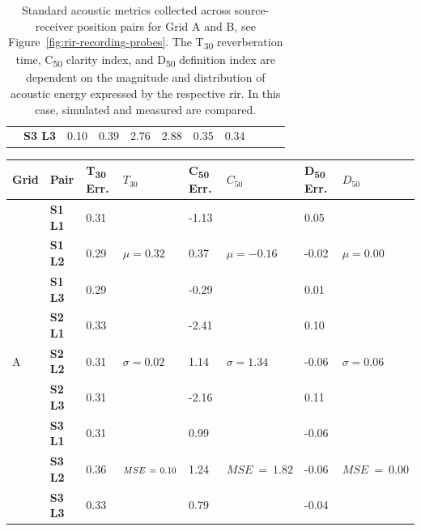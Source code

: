 \begin{table}[]
\begin{tabular}{@{}lllllllllll@{}}
                        & \textbf{S3 L3} & 0.10 & 0.39 & 2.76 & 2.88 & 0.35 & 0.34 \\ \cmidrule(l){1-8} 
\end{tabular}
\caption{Standard acoustic metrics collected across source-receiver position pairs for Grid A and B, see Figure~\ref{fig:rir-recording-probes}. The T\textsubscript{30} reverberation time, C\textsubscript{50} clarity index, and D\textsubscript{50} definition index are dependent on the magnitude and distribution of acoustic energy expressed by the respective \acrshort{rir}. In this case, simulated and measured  are compared.}
\label{tab:rt-metrics}
\end{table}

\begin{table}[]
\begin{tabular}{@{}llllllll@{}}
\toprule
Grid & Pair & T\textsubscript{30} Err. & $T_{30}$ & C\textsubscript{50} Err. & $C_{50}$ & D\textsubscript{50} Err. &  $D_{50}$ \\ \midrule
    \multirow{9}{*}{A}  & \textbf{S1 L1} & 0.31  & \multirow{3}{*}{$\mu = 0.32$} & -1.13 & \multirow{3}{*}{$\mu = -0.16$} & 0.05  & \multirow{3}{*}{$\mu = 0.00$} \\
       & \textbf{S1 L2} & 0.29 &                       & 0.37  &                        & -0.02 &                       \\
       & \textbf{S1 L3} & 0.29 &                       & -0.29 &                        & 0.01  &                       \\
       & \textbf{S2 L1} & 0.33 & \multirow{3}{*}{$\sigma = 0.02$} & -2.41 & \multirow{3}{*}{$\sigma = 1.34$}  & 0.10  & \multirow{3}{*}{$\sigma = 0.06$} \\
       & \textbf{S2 L2} & 0.31 &                       & 1.14  &                        & -0.06 &                       \\
       & \textbf{S2 L3} & 0.31 &                       & -2.16 &                        & 0.11  &                       \\
       & \textbf{S3 L1} & 0.31 & \multirow{3}{*}{$\scriptstyle{MSE}~=~\normalsize{0.10}$} & 0.99  & \multirow{3}{*}{$\scriptstyle{MSE}~=~1.82$}  & -0.06 & \multirow{3}{*}{$\scriptstyle{MSE}~=~0.00$} \\
       & \textbf{S3 L2} & 0.36 &                       & 1.24  &                        & -0.06 &                       \\
       & \textbf{S3 L3} & 0.33 &                       & 0.79  &                        & -0.04 &                       \\ \cmidrule(l){1-8}

\end{tabular}
\end{table}
